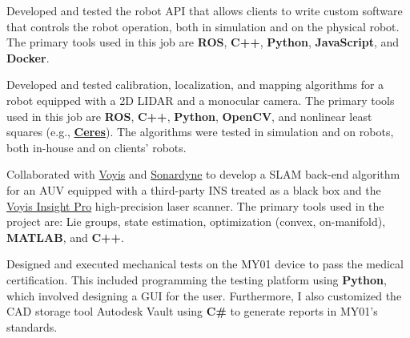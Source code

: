 \documentclass[10pt,letter]{altacv}
\begin{document}

Developed and tested the robot API that allows clients to write custom software that controls the robot operation, both in simulation and on the physical robot.
The primary tools used in this job are \textbf{ROS}, \textbf{C++}, \textbf{Python}, \textbf{JavaScript}, and \textbf{Docker}.

\divider

Developed and tested calibration, localization, and mapping algorithms for a robot equipped with a 2D LIDAR and a monocular camera.
The primary tools used in this job are \textbf{ROS}, \textbf{C++}, \textbf{Python}, \textbf{OpenCV}, and nonlinear least squares (e.g., \href{https://github.com/ceres-solver/ceres-solver}{\textbf{Ceres}}).
The algorithms were tested in simulation and on robots, both in-house and on clients' robots.

\divider

Collaborated with \href{https://voyis.com/}{Voyis} and \href{https://www.sonardyne.com/}{Sonardyne} to develop a SLAM back-end algorithm for an AUV equipped with a third-party INS treated as a black box and the \href{https://voyis.com/insight-pro}{Voyis Insight Pro} high-precision laser scanner.
The primary tools used in the project are:
Lie groups, state estimation, optimization (convex, on-manifold), \textbf{MATLAB}, and \textbf{C++}.

\divider

Designed and executed mechanical tests on the MY01 device to pass the medical certification.
This included programming the testing platform using \textbf{Python}, which involved designing a GUI for the user.
Furthermore, I also customized the CAD storage tool Autodesk Vault using \textbf{C\#} to generate reports in MY01's standards.
\end{document}
